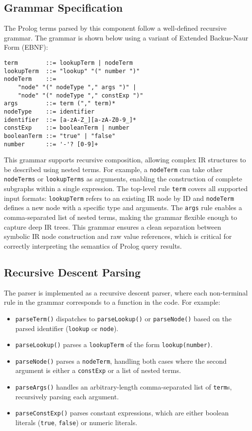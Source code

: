 \subsection{Grammar Specification}

The Prolog terms parsed by this component follow a well-defined recursive grammar. The grammar is shown below using a variant of Extended Backus-Naur Form (EBNF):

\begin{lstlisting}[basicstyle=\ttfamily]
term        ::= lookupTerm | nodeTerm  
lookupTerm  ::= "lookup" "(" number ")"  
nodeTerm    ::= 
    "node" "(" nodeType "," args ")" | 
    "node" "(" nodeType "," constExp ")"  
args        ::= term ("," term)*  
nodeType    ::= identifier  
identifier  ::= [a-zA-Z_][a-zA-Z0-9_]* 
constExp    ::= booleanTerm | number
booleanTerm ::= "true" | "false"  
number      ::= '-'? [0-9]+
\end{lstlisting}

This grammar supports recursive composition, allowing complex IR structures to be described using nested terms. For example, a \texttt{nodeTerm} can take other \texttt{nodeTerms} or \texttt{lookupTerms} as arguments, enabling the construction of complete subgraphs within a single expression. 
The top-level rule \texttt{term} covers all supported input formats: \texttt{lookupTerm} refers to an existing IR node by ID and \texttt{nodeTerm} defines a new node with a specific type and arguments. The \texttt{args} rule enables a comma-separated list of nested terms, making the grammar flexible enough to capture deep IR trees.
This grammar ensures a clean separation between symbolic IR node construction and raw value references, which is critical for correctly interpreting the semantics of Prolog query results.

\subsection{Recursive Descent Parsing}

The parser is implemented as a recursive descent parser, where each non-terminal rule in the grammar corresponds to a function in the code. For example:

\begin{itemize}
    \item \texttt{parseTerm()} dispatches to \texttt{parseLookup()} or \texttt{parseNode()} based on the parsed identifier (\texttt{lookup} or \texttt{node}).
    \item \texttt{parseLookup()} parses a \texttt{lookupTerm} of the form \texttt{lookup(number)}.
    \item \texttt{parseNode()} parses a \texttt{nodeTerm}, handling both cases where the second argument is either a \texttt{constExp} or a list of nested terms.
    \item \texttt{parseArgs()} handles an arbitrary-length comma-separated list of \texttt{term}s, recursively parsing each argument.
    \item \texttt{parseConstExp()} parses constant expressions, which are either boolean literals (\texttt{true}, \texttt{false}) or numeric literals.
\end{itemize}

